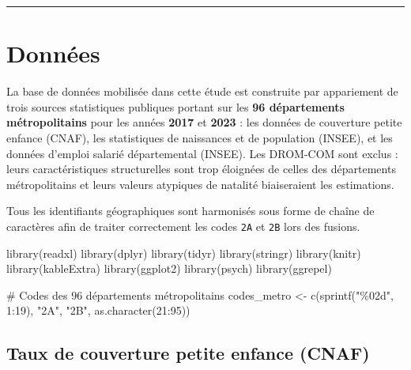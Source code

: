 \documentclass[
  letterpaper,
  DIV=11,
  numbers=noendperiod]{scrartcl}
\newenvironment{Shaded}{\begin{snugshade}}{\end{snugshade}}
\newcommand{\CommentTok}[1]{\textcolor[rgb]{0.37,0.37,0.37}{#1}}
\newcommand{\DecValTok}[1]{\textcolor[rgb]{0.68,0.00,0.00}{#1}}
\newcommand{\FunctionTok}[1]{\textcolor[rgb]{0.28,0.35,0.67}{#1}}
\newcommand{\NormalTok}[1]{\textcolor[rgb]{0.00,0.23,0.31}{#1}}
\newcommand{\OtherTok}[1]{\textcolor[rgb]{0.00,0.23,0.31}{#1}}
\newcommand{\SpecialCharTok}[1]{\textcolor[rgb]{0.37,0.37,0.37}{#1}}
\newcommand{\StringTok}[1]{\textcolor[rgb]{0.13,0.47,0.30}{#1}}
\begin{document}
\begin{center}\rule{0.5\linewidth}{0.5pt}\end{center}

\section{Données}\label{donnuxe9es}

La base de données mobilisée dans cette étude est construite par
appariement de trois sources statistiques publiques portant sur les
\textbf{96 départements métropolitains} pour les années \textbf{2017} et
\textbf{2023} : les données de couverture petite enfance (CNAF), les
statistiques de naissances et de population (INSEE), et les données
d'emploi salarié départemental (INSEE). Les DROM-COM sont exclus : leurs
caractéristiques structurelles sont trop éloignées de celles des
départements métropolitains et leurs valeurs atypiques de natalité
biaiseraient les estimations.

Tous les identifiants géographiques sont harmonisés sous forme de chaîne
de caractères afin de traiter correctement les codes \texttt{2A} et
\texttt{2B} lors des fusions.

\begin{Shaded}
\begin{Highlighting}[]
\FunctionTok{library}\NormalTok{(readxl)}
\FunctionTok{library}\NormalTok{(dplyr)}
\FunctionTok{library}\NormalTok{(tidyr)}
\FunctionTok{library}\NormalTok{(stringr)}
\FunctionTok{library}\NormalTok{(knitr)}
\FunctionTok{library}\NormalTok{(kableExtra)}
\FunctionTok{library}\NormalTok{(ggplot2)}
\FunctionTok{library}\NormalTok{(psych)}
\FunctionTok{library}\NormalTok{(ggrepel)}

\CommentTok{\# Codes des 96 départements métropolitains}
\NormalTok{codes\_metro }\OtherTok{\textless{}{-}} \FunctionTok{c}\NormalTok{(}\FunctionTok{sprintf}\NormalTok{(}\StringTok{"\%02d"}\NormalTok{, }\DecValTok{1}\SpecialCharTok{:}\DecValTok{19}\NormalTok{), }\StringTok{"2A"}\NormalTok{, }\StringTok{"2B"}\NormalTok{, }\FunctionTok{as.character}\NormalTok{(}\DecValTok{21}\SpecialCharTok{:}\DecValTok{95}\NormalTok{))}
\end{Highlighting}
\end{Shaded}

\subsection{Taux de couverture petite enfance
(CNAF)}\label{taux-de-couverture-petite-enfance-cnaf}
\end{document}
